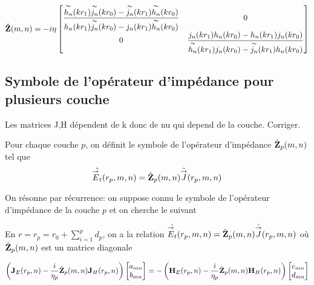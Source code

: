         \begin{equation}
            \hat{\mZ}(m,n) = -i\eta
            \begin{bmatrix}
                \frac
                {\tilde{h_n}(kr_1)\tilde{j_n}(kr_0)-\tilde{j_n}(kr_1)\tilde{h_n}(kr_0)}
                {{h_n}(kr_1)\tilde{j_n}(kr_0)-{j_n}(kr_1)\tilde{h_n}(kr_0)} & 0
                \\
                0 & \frac
                {{j_n}(kr_1){h_n}(kr_0)-{h_n}(kr_1){j_n}(kr_0)}
                {\tilde{h_n}(kr_1){j_n}(kr_0)-\tilde{j_n}(kr_1){h_n}(kr_0)}
            \end{bmatrix}
        \end{equation}

    \subsection{Symbole de l'opérateur d'impédance pour plusieurs couche}

        \begin{TODO}
            Les matrices J,H dépendent de k donc de nu qui depend de la couche. Corriger.
        \end{TODO}

        \begin{figure}[!hbt]
          \centering
          \begin{tikzpicture}
            
          \end{tikzpicture}
        \end{figure}


        \begin{defn}
          Pour chaque couche \(p\), on définit le symbole de l'opérateur d'impédance \(\hat{\mZ}_p(m,n)\) tel que 
          \[
              \hat{\vE_t}(r_p,m,n) = \hat{\mZ}_p(m,n)\hat{\vJ}(r_p,m,n)
          \]
        \end{defn}

        On résonne par récurrence: on suppose connu le symbole de l'opérateur d'impédance de la couche \(p\) et on cherche le suivant

        En \(r=r_{p}=r_0+\sum_{i=1}^p d_p\), on a la relation \( \hat{\vE_t}(r_p,m,n) = \hat{\mZ}_p(m,n)\hat{\vJ}(r_p,m,n)\) où \(\hat{\mZ}_p(m,n)\) est un matrice diagonale

        \begin{equation}
            \left(\mJ_{E}(r_p,n) - \frac{i}{\eta_p}\hat{\mZ}_p(m,n)\mJ_{H}(r_p,n) \right)
            \begin{bmatrix}
                a_{mn}
                \\
                b_{mn}
            \end{bmatrix}
            = -
            \left(\mH_{E}(r_p,n) - \frac{i}{\eta_p}\hat{\mZ}_p(m,n)\mH_{H}(r_p,n) \right)
            \begin{bmatrix}
                c_{mn}
                \\
                d_{mn}
            \end{bmatrix}
        \end{equation}

